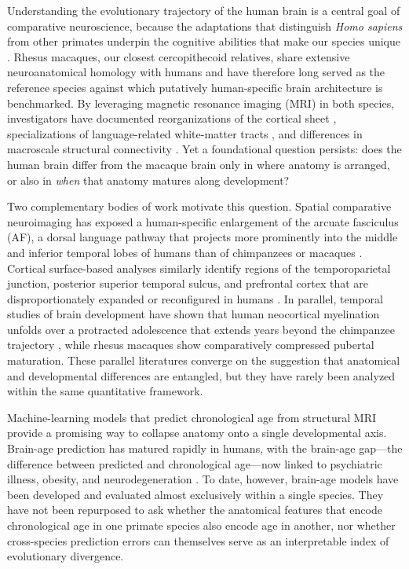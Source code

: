 \documentclass[11pt]{article}
\begin{document}
Understanding the evolutionary trajectory of the human brain is a central goal of comparative neuroscience, because the adaptations that distinguish \textit{Homo sapiens} from other primates underpin the cognitive abilities that make our species unique \citep{rilling2014comparative, sherwood2013whats}. Rhesus macaques, our closest cercopithecoid relatives, share extensive neuroanatomical homology with humans and have therefore long served as the reference species against which putatively human-specific brain architecture is benchmarked. By leveraging magnetic resonance imaging (MRI) in both species, investigators have documented reorganizations of the cortical sheet \citep{hill2010similar, smaers2019brain}, specializations of language-related white-matter tracts \citep{rilling2008evolution, eichert2019special, balezeau2020primate}, and differences in macroscale structural connectivity \citep{goulas2014comparative}. Yet a foundational question persists: does the human brain differ from the macaque brain only in where anatomy is arranged, or also in \textit{when} that anatomy matures along development?

Two complementary bodies of work motivate this question. Spatial comparative neuroimaging has exposed a human-specific enlargement of the arcuate fasciculus (AF), a dorsal language pathway that projects more prominently into the middle and inferior temporal lobes of humans than of chimpanzees or macaques \citep{rilling2008evolution, rilling2012continuity, catani2008arcuate}. Cortical surface-based analyses similarly identify regions of the temporoparietal junction, posterior superior temporal sulcus, and prefrontal cortex that are disproportionately expanded or reconfigured in humans \citep{hill2010similar, patel2019temporoparietal, smaers2011primate}. In parallel, temporal studies of brain development have shown that human neocortical myelination unfolds over a protracted adolescence that extends years beyond the chimpanzee trajectory \citep{miller2012prolonged, perrin2009sex, dubois2014early}, while rhesus macaques show comparatively compressed pubertal maturation. These parallel literatures converge on the suggestion that anatomical and developmental differences are entangled, but they have rarely been analyzed within the same quantitative framework.

Machine-learning models that predict chronological age from structural MRI provide a promising way to collapse anatomy onto a single developmental axis. Brain-age prediction has matured rapidly in humans, with the brain-age gap---the difference between predicted and chronological age---now linked to psychiatric illness, obesity, and neurodegeneration \citep{cole2017predicting, franke2010estimating, hajek2019brain, mcwhinney2021obesity}. To date, however, brain-age models have been developed and evaluated almost exclusively within a single species. They have not been repurposed to ask whether the anatomical features that encode chronological age in one primate species also encode age in another, nor whether cross-species prediction errors can themselves serve as an interpretable index of evolutionary divergence.
\end{document}
